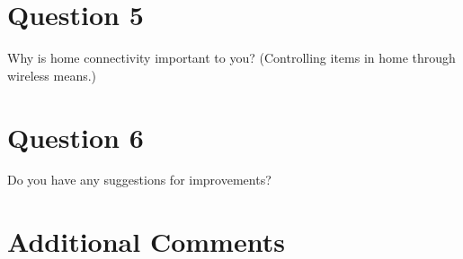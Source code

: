 \documentclass[11pt]{article}
\begin{document}
	\section*{Question 5}
		Why is home connectivity important to you? (Controlling items in home through wireless means.)
		\vspace{.8 in}

	\section*{Question 6}
		Do you have any suggestions for improvements?
		\vspace{.8 in}

	\section*{Additional Comments}
		\vspace{.8 in}
\end{document}
